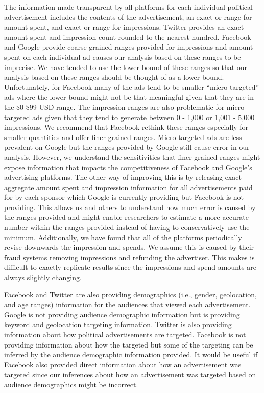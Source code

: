 \documentclass[fleqn,10pt]{wlscirep}
\begin{document}
The information made transparent by all platforms for each individual political advertisement includes the contents of the advertisement, an exact or range for amount spent, and exact or range for impressions. Twitter provides an exact amount spent and impression count rounded to the nearest hundred. Facebook and Google provide coarse-grained ranges provided for impressions and amount spent on each individual ad causes our analysis based on these ranges to be imprecise. We have tended to use the lower bound of these ranges so that our analysis based on these ranges should be thought of as a lower bound. Unfortunately, for Facebook many of the ads tend to be smaller ``micro-targeted'' ads where the lower bound might not be that meaningful given that they are in the \$0-\$99 USD range. The impression ranges are also problematic for micro-targeted ads given that they tend to generate between 0 - 1,000 or 1,001 - 5,000 impressions. We recommend that Facebook rethink these ranges especially for smaller quantities and offer finer-grained ranges. Micro-targeted ads are less prevalent on Google but the ranges provided by Google still cause error in our analysis. However, we understand the sensitivities that finer-grained ranges might expose information that impacts the competitiveness of Facebook and Google's advertising platforms. The other way of improving this is by releasing exact aggregate amount spent and impression information for all advertisements paid for by each sponsor which Google is currently providing but Facebook is not providing. This allows us and others to understand how much error is caused by the ranges provided and might enable researchers to estimate a more accurate number within the ranges provided instead of having to conservatively use the minimum. Additionally, we have found that all of the platforms periodically revise downwards the impression and spends. We assume this is caused by their fraud systems removing impressions and refunding the advertiser. This makes is difficult to exactly replicate results since the impressions and spend amounts are always slightly changing.

Facebook and Twitter are also providing demographics (i.e., gender, geolocation, and age ranges) information for the audiences that viewed each advertisement. Google is not providing audience demographic information but is providing keyword and geolocation targeting information. Twitter is also providing information about how political advertisements are targeted. Facebook is not providing information about how the targeted but some of the targeting can be inferred by the audience demographic information provided. It would be useful if Facebook also provided direct information about how an advertisement was targeted since our inferences about how an advertisement was targeted based on audience demographics might be incorrect.
\end{document}
